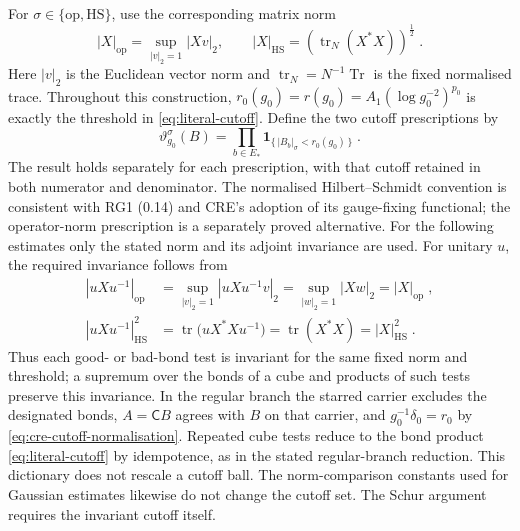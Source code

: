 \documentclass[11pt]{article}
\newcommand{\tr}{\operatorname{tr}}
\begin{document}
For $\sigma\in \{\mathrm{op},\mathrm{HS}\}$, use the corresponding matrix norm
\begin{equation}\label{eq:marginal-two-norms}
    |X|_{\mathrm{op}}=\sup_{|v|_2=1}|Xv|_2,
    \qquad |X|_{\mathrm{HS}}=
        \left(\tr_N(X^*X)\right)^{\frac{1}{2}}\;.
\end{equation}
Here $|v|_2$ is the Euclidean vector norm and $\tr_N=N^{-1}\operatorname{Tr}$ is the fixed normalised trace. Throughout this construction, $r_0(g_0)=r(g_0)=A_1(\log g_0^{-2})^{p_0}$ is exactly the threshold in \eqref{eq:literal-cutoff}. Define the two cutoff prescriptions by
\begin{equation}\label{eq:marginal-two-cutoffs}
    \vartheta_{g_0}^{\sigma}(B)
        =\prod_{b\in E_*}
            \mathbf1_{\{\,|B_b|_\sigma<r_0(g_0)\,\}}\;.
\end{equation}
The result holds separately for each prescription, with that cutoff retained in both numerator and denominator. The normalised Hilbert--Schmidt convention is consistent with RG1 (0.14) and CRE's adoption of its gauge-fixing functional; the operator-norm prescription is a separately proved alternative. For the following estimates only the stated norm and its adjoint invariance are used. For unitary $u$, the required invariance follows from
\begin{equation}\label{eq:marginal-cutoff-invariance}
    \begin{aligned}
        |uXu^{-1}|_{\mathrm{op}}
            &=\sup_{|v|_2=1}|uXu^{-1}v|_2
                =\sup_{|w|_2=1}|Xw|_2=|X|_{\mathrm{op}}\;,\\
        |uXu^{-1}|_{\mathrm{HS}}^2
            &=\operatorname{tr}\bigl(uX^*Xu^{-1}\bigr)
                =\operatorname{tr}(X^*X)=|X|_{\mathrm{HS}}^2\;.
    \end{aligned}
\end{equation}
Thus each good- or bad-bond test is invariant for the same fixed norm and threshold; a supremum over the bonds of a cube and products of such tests preserve this invariance. In the regular branch the starred carrier excludes the designated bonds, $A=\mathsf C B$ agrees with $B$ on that carrier, and $g_0^{-1}\delta_0=r_0$ by \eqref{eq:cre-cutoff-normalisation}. Repeated cube tests reduce to the bond product \eqref{eq:literal-cutoff} by idempotence, as in the stated regular-branch reduction. This dictionary does not rescale a cutoff ball. The norm-comparison constants used for Gaussian estimates likewise do not change the cutoff set. The Schur argument requires the invariant cutoff itself.
\end{document}
